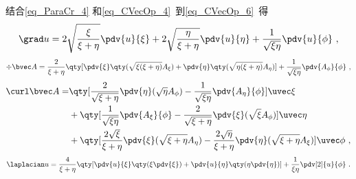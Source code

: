 结合\autoref{eq_ParaCr_4} 和\autoref{eq_CVecOp_4}~到\autoref{eq_CVecOp_6}~得
\begin{equation}
\grad u = 2\sqrt{\frac{\xi}{\xi + \eta}}\pdv{u}{\xi} + 2\sqrt{\frac{\eta}{\xi + \eta}}\pdv{u}{\eta} + \frac{1}{\sqrt{\xi\eta}}\pdv{u}{\phi}~,
\end{equation}
\begin{equation}
\div \bvec A = \frac{2}{\xi + \eta}\qty[\pdv{\xi}\qty(\sqrt{\xi(\xi+\eta)}A_\xi) + \pdv{\eta}\qty(\sqrt{\eta(\xi+\eta)}A_\eta)] + \frac{1}{\sqrt{\xi\eta}} \pdv{A_\phi}{\phi}~,
\end{equation}
\begin{equation}
\begin{aligned}
\curl \bvec A = &\qty[\frac{2}{\sqrt{\xi+\eta}}\pdv{\eta} (\sqrt{\eta}A_\phi) - \frac{1}{\sqrt{\xi\eta}}\pdv{A_\eta}{\phi}]\uvec \xi\\
&+\qty[\frac{1}{\sqrt{\xi\eta}}\pdv{A_\xi}{\phi} - \frac{2}{\sqrt{\xi+\eta}}\pdv{\xi}(\sqrt{\xi}A_\phi)]\uvec\eta\\
&+\qty[\frac{2\sqrt{\xi}}{\xi+\eta}\pdv{\xi}(\sqrt{\xi+\eta}A_\eta) - \frac{2\sqrt{\eta}}{\xi+\eta}\pdv{\eta}(\sqrt{\xi+\eta}A_\xi)]\uvec\phi~,
\end{aligned}
\end{equation}
\begin{equation} %
\laplacian u = \frac{4}{\xi + \eta} \qty[\pdv{u}{\xi}\qty(\xi\pdv{\xi}) + \pdv{u}{\eta}\qty(\eta\pdv{\eta})] + \frac{1}{\xi\eta}\pdv[2]{u}{\phi}~.
\end{equation}
